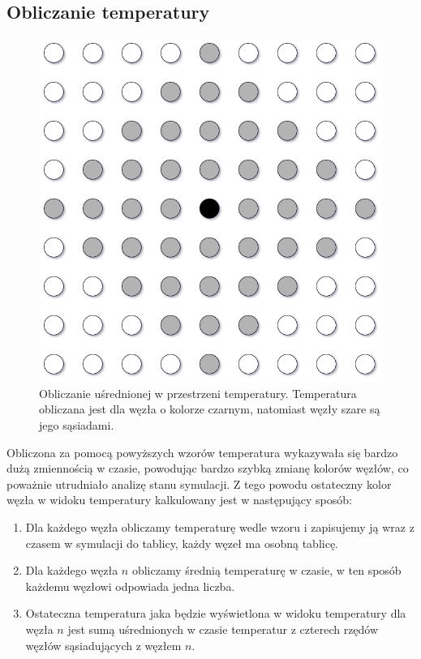 \documentclass[12pt, letterpaper]{report}
\begin{document}
    \subsection{Obliczanie temperatury}
    \begin{figure}
        \includegraphics[width=0.95\linewidth]{avg.drawio}
        \caption{
            Obliczanie uśrednionej w przestrzeni temperatury.
            Temperatura obliczana jest dla węzła o kolorze czarnym, 
            natomiast węzły szare są jego sąsiadami.
        }
    \end{figure}

    Obliczona za pomocą powyższych wzorów temperatura wykazywała się bardzo dużą zmiennością w czasie,
    powodując bardzo szybką zmianę kolorów węzłów, co poważnie utrudniało analizę stanu symulacji. 
    Z tego powodu ostateczny kolor węzła w widoku temperatury kalkulowany jest w następujący sposób:
    \begin{enumerate}
        \item Dla każdego węzła obliczamy temperaturę wedle wzoru i zapisujemy ją wraz z czasem w
        symulacji do tablicy, każdy węzeł ma osobną tablicę.
        \item Dla każdego węzła $n$ obliczamy średnią temperaturę w czasie, w ten sposób każdemu węzłowi
        odpowiada jedna liczba.
        \item Ostateczna temperatura jaka będzie wyświetlona w widoku temperatury dla węzła $n$
        jest sumą uśrednionych w czasie temperatur z czterech rzędów węzłów sąsiadujących z
        węzłem $n$.
    \end{enumerate}
\end{document}
